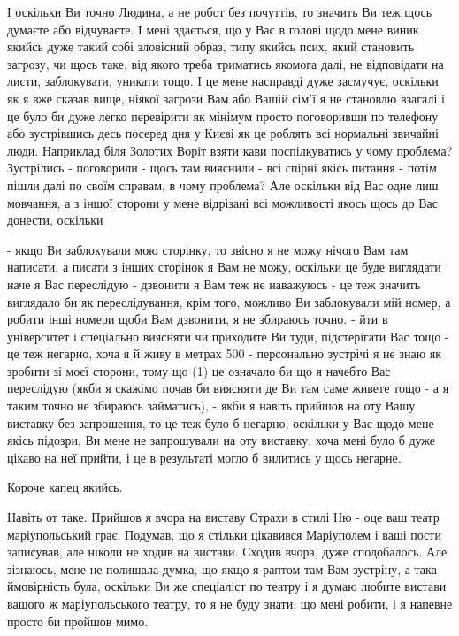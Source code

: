 І оскільки Ви точно Людина, а не робот без почуттів, то значить Ви теж щось думаєте або відчуваєте.
І мені здається, що у Вас в голові щодо мене виник якийсь дуже такий собі зловісний образ, типу
якийсь псих, який становить загрозу, чи щось таке, від якого треба триматись якомога далі, не відповідати на листи, заблокувати,
уникати тощо. І це мене насправді дуже засмучує, оскільки як я вже сказав вище, ніякої загрози Вам або Вашій сім'ї
я не становлю взагалі і це було би дуже легко перевірити як мінімум просто поговоривши по телефону або зустрівшись
десь посеред дня у Києві як це роблять всі нормальні звичайні люди. 
Наприклад біля Золотих Воріт взяти кави поспілкуватись у чому проблема?
Зустрілись - поговорили - щось там вияснили - всі спірні якісь питання - потім пішли далі по своїм справам, 
в чому проблема?
Але оскільки від Вас одне лиш мовчання, а з іншої сторони у мене відрізані всі можливості
якось щось до Вас донести, оскільки

- якщо Ви заблокували мою сторінку, то звісно я не можу нічого Вам там написати,
а писати з інших сторінок я Вам не можу, оскільки це буде виглядати наче я Вас переслідую
- дзвонити я Вам теж не наважуюсь - це теж значить виглядало би як переслідування, крім того, можливо Ви заблокували мій номер,
а робити інші номери щоби Вам дзвонити, я не збираюсь точно.
- йти в університет і спеціально виясняти чи приходите Ви туди, підстерігати Вас тощо - це теж негарно, 
хоча я й живу в метрах 500 
- персонально зустрічі я не знаю як зробити зі моєї сторони, тому що (1) це означало
би що я начебто Вас переслідую (якби я скажімо почав би виясняти де Ви там саме живете тощо - а я таким точно не збираюсь займатись),
- якби я навіть прийшов на оту Вашу виставку без запрошення, то це теж було б негарно, оскільки у Вас щодо
мене якісь підозри, Ви мене не запрошували на оту виставку, хоча мені було б дуже цікаво на неї прийти, і це в результаті могло б вилитись у щось негарне.

Короче капец якийсь.

Навіть от таке. Прийшов я вчора на виставу Страхи в стилі Ню - оце ваш театр маріупольський грає.
Подумав, що я стільки цікавився Маріуполем і ваші пости записував, але ніколи не ходив на вистави.
Сходив вчора, дуже сподобалось. Але зізнаюсь, мене не полишала думка, що якщо я раптом там Вам зустріну, а така ймовірність була, оскільки
Ви же спеціаліст по театру і я думаю любите вистави вашого ж маріупольського театру, то
я не буду знати, що мені робити, і я напевне просто би пройшов мимо. 

